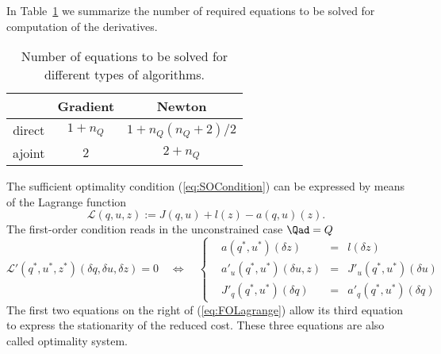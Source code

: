 In Table~\ref{tab:nsolve} we summarize the number of required equations to be solved for computation of the derivatives.
\begin{table}[!htpb]
\begin{center}
\begin{tabular}{c|c|c}
       & Gradient & Newton\\\hline
direct & $1 + n_Q$ & $1 + n_Q(n_Q+2)/2$\\
ajoint & $2$ & $2 + n_Q$
\end{tabular}
\end{center}
\caption{Number of equations to be solved for different types of algorithms.}
\label{tab:nsolve}
\end{table}
%

The sufficient optimality condition (\ref{eq:SOCondition}) can be expressed by means of the Lagrange function
%
\begin{equation}\label{eq:}
\mathcal L(q,u,z) := J(q,u)+ l(z) - a(q,u)(z).
\end{equation}
%
The first-order condition reads in the unconstrained case $\Qad=Q$
%
\begin{equation}\label{eq:FOLagrange}
\mathcal L'(q^*,u^*,z^*)(\delta q, \delta u,\delta z) = 0 \quad\Leftrightarrow\quad 
%
\left\{
\begin{aligned}
&a(q^*,u^*)(\delta z) &=& l(\delta z)\\
&a'_u(q^*,u^*)(\delta u, z) &=& J'_u(q^*,u^*)(\delta u)\\
&J'_q(q^*,u^*)(\delta q) &=& a'_q(q^*,u^*)(\delta q)
\end{aligned}
\right.
%
\end{equation}
%
The first two equations on the right of (\ref{eq:FOLagrange}) allow its third equation to express the stationarity of the reduced cost. These three equations are also called optimality system.

